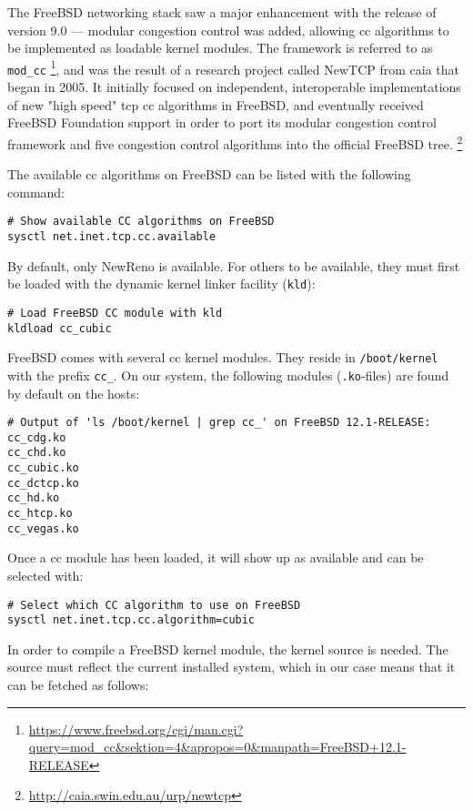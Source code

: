The FreeBSD networking stack saw a major enhancement with the release of version 9.0 --- modular congestion control was added, allowing \gls{cc} algorithms to be implemented as loadable kernel modules. The framework is referred to as \lstinline{mod_cc} \footnote{\url{https://www.freebsd.org/cgi/man.cgi?query=mod_cc&sektion=4&apropos=0&manpath=FreeBSD+12.1-RELEASE}}, and was the result of a research project called NewTCP from \gls{caia} that began in 2005. It initially focused on independent, interoperable implementations of new "high speed" \gls{tcp} \gls{cc} algorithms in FreeBSD, and eventually received FreeBSD Foundation support in order to port its modular congestion control framework and five congestion control algorithms into the official FreeBSD tree. \footnote{\url{http://caia.swin.edu.au/urp/newtcp}}

The available \gls{cc} algorithms on FreeBSD can be listed with the following command:

\begin{verbatim}
# Show available CC algorithms on FreeBSD
sysctl net.inet.tcp.cc.available
\end{verbatim}
By default, only NewReno is available. For others to be available, they must first be loaded with the dynamic kernel linker facility (\lstinline{kld}):

\begin{verbatim}
# Load FreeBSD CC module with kld
kldload cc_cubic
\end{verbatim}
FreeBSD comes with several \gls{cc} kernel modules. They reside in \lstinline{/boot/kernel} with the prefix \lstinline{cc_}. On our system, the following modules (\lstinline{.ko}-files) are found by default on the hosts:

\begin{verbatim}
# Output of 'ls /boot/kernel | grep cc_' on FreeBSD 12.1-RELEASE:
cc_cdg.ko
cc_chd.ko
cc_cubic.ko
cc_dctcp.ko
cc_hd.ko
cc_htcp.ko
cc_vegas.ko
\end{verbatim}
Once a \gls{cc} module has been loaded, it will show up as available and can be selected with:

\begin{verbatim}
# Select which CC algorithm to use on FreeBSD
sysctl net.inet.tcp.cc.algorithm=cubic
\end{verbatim}
In order to compile a FreeBSD kernel module, the kernel source is needed. The source must reflect the current installed system, which in our case means that it can be fetched as follows:

